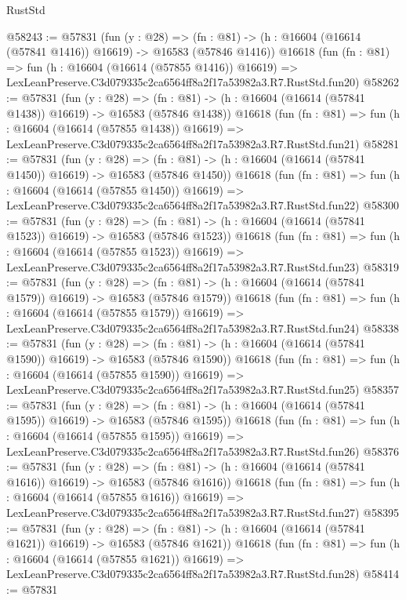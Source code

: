 \begin{lexlean}{RustStd}
\begin{coremodule}
@58243 := @57831
    (fun (y : @28) =>
    (fn : @81) -> (h : @16604 (@16614 (@57841 @1416)) @16619) -> @16583 (@57846 @1416))
    @16618
    (fun (fn : @81) =>
    fun (h : @16604 (@16614 (@57855 @1416)) @16619) =>
    LexLeanPreserve.C3d079335c2ca6564ff8a2f17a53982a3.R7.RustStd.fun20)
@58262 := @57831
    (fun (y : @28) =>
    (fn : @81) -> (h : @16604 (@16614 (@57841 @1438)) @16619) -> @16583 (@57846 @1438))
    @16618
    (fun (fn : @81) =>
    fun (h : @16604 (@16614 (@57855 @1438)) @16619) =>
    LexLeanPreserve.C3d079335c2ca6564ff8a2f17a53982a3.R7.RustStd.fun21)
@58281 := @57831
    (fun (y : @28) =>
    (fn : @81) -> (h : @16604 (@16614 (@57841 @1450)) @16619) -> @16583 (@57846 @1450))
    @16618
    (fun (fn : @81) =>
    fun (h : @16604 (@16614 (@57855 @1450)) @16619) =>
    LexLeanPreserve.C3d079335c2ca6564ff8a2f17a53982a3.R7.RustStd.fun22)
@58300 := @57831
    (fun (y : @28) =>
    (fn : @81) -> (h : @16604 (@16614 (@57841 @1523)) @16619) -> @16583 (@57846 @1523))
    @16618
    (fun (fn : @81) =>
    fun (h : @16604 (@16614 (@57855 @1523)) @16619) =>
    LexLeanPreserve.C3d079335c2ca6564ff8a2f17a53982a3.R7.RustStd.fun23)
@58319 := @57831
    (fun (y : @28) =>
    (fn : @81) -> (h : @16604 (@16614 (@57841 @1579)) @16619) -> @16583 (@57846 @1579))
    @16618
    (fun (fn : @81) =>
    fun (h : @16604 (@16614 (@57855 @1579)) @16619) =>
    LexLeanPreserve.C3d079335c2ca6564ff8a2f17a53982a3.R7.RustStd.fun24)
@58338 := @57831
    (fun (y : @28) =>
    (fn : @81) -> (h : @16604 (@16614 (@57841 @1590)) @16619) -> @16583 (@57846 @1590))
    @16618
    (fun (fn : @81) =>
    fun (h : @16604 (@16614 (@57855 @1590)) @16619) =>
    LexLeanPreserve.C3d079335c2ca6564ff8a2f17a53982a3.R7.RustStd.fun25)
@58357 := @57831
    (fun (y : @28) =>
    (fn : @81) -> (h : @16604 (@16614 (@57841 @1595)) @16619) -> @16583 (@57846 @1595))
    @16618
    (fun (fn : @81) =>
    fun (h : @16604 (@16614 (@57855 @1595)) @16619) =>
    LexLeanPreserve.C3d079335c2ca6564ff8a2f17a53982a3.R7.RustStd.fun26)
@58376 := @57831
    (fun (y : @28) =>
    (fn : @81) -> (h : @16604 (@16614 (@57841 @1616)) @16619) -> @16583 (@57846 @1616))
    @16618
    (fun (fn : @81) =>
    fun (h : @16604 (@16614 (@57855 @1616)) @16619) =>
    LexLeanPreserve.C3d079335c2ca6564ff8a2f17a53982a3.R7.RustStd.fun27)
@58395 := @57831
    (fun (y : @28) =>
    (fn : @81) -> (h : @16604 (@16614 (@57841 @1621)) @16619) -> @16583 (@57846 @1621))
    @16618
    (fun (fn : @81) =>
    fun (h : @16604 (@16614 (@57855 @1621)) @16619) =>
    LexLeanPreserve.C3d079335c2ca6564ff8a2f17a53982a3.R7.RustStd.fun28)
@58414 := @57831

\end{coremodule}
\end{lexlean}
